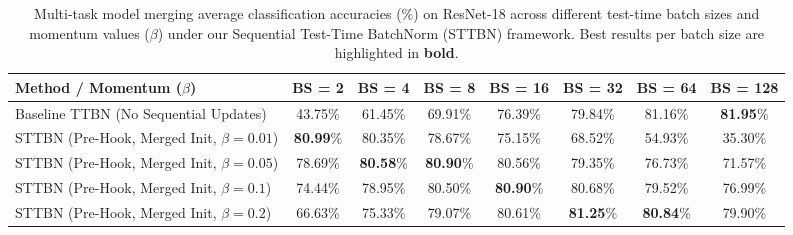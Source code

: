 \documentclass{article}
\theoremstyle{plain}
\theoremstyle{definition}
\theoremstyle{remark}
\begin{document}
\begin{table}[t]
\caption{Multi-task model merging average classification accuracies (\%) on ResNet-18 across different test-time batch sizes and momentum values ($\beta$) under our Sequential Test-Time BatchNorm (STTBN) framework. Best results per batch size are highlighted in \textbf{bold}.}
\label{tab:sttbn_robustness}
\vskip 0.15in
\begin{center}
\begin{small}
\setlength{\tabcolsep}{4.5pt}
\begin{tabular}{lccccccc}
\toprule
Method / Momentum ($\beta$) & BS = 2 & BS = 4 & BS = 8 & BS = 16 & BS = 32 & BS = 64 & BS = 128 \\
\midrule
Baseline TTBN (No Sequential Updates) & 43.75\% & 61.45\% & 69.91\% & 76.39\% & 79.84\% & 81.16\% & \textbf{81.95}\% \\
\midrule
STTBN (Pre-Hook, Merged Init, $\beta = 0.01$) & \textbf{80.99}\% & 80.35\% & 78.67\% & 75.15\% & 68.52\% & 54.93\% & 35.30\% \\
STTBN (Pre-Hook, Merged Init, $\beta = 0.05$) & 78.69\% & \textbf{80.58}\% & \textbf{80.90}\% & 80.56\% & 79.35\% & 76.73\% & 71.57\% \\
STTBN (Pre-Hook, Merged Init, $\beta = 0.1$) & 74.44\% & 78.95\% & 80.50\% & \textbf{80.90}\% & 80.68\% & 79.52\% & 76.99\% \\
STTBN (Pre-Hook, Merged Init, $\beta = 0.2$) & 66.63\% & 75.33\% & 79.07\% & 80.61\% & \textbf{81.25}\% & \textbf{80.84}\% & 79.90\% \\
\bottomrule
\end{tabular}
\end{small}
\end{center}
\vskip -0.1in
\end{table}
\end{document}

